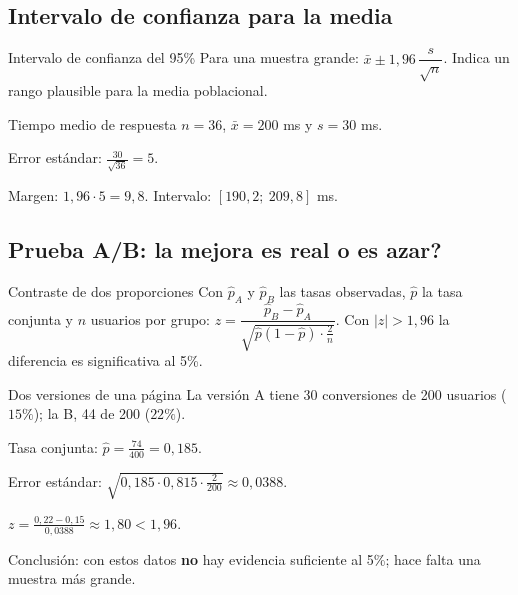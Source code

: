 \begin{center}
\end{center}

\subsection{Intervalo de confianza para la media}
\begin{tmdef}{Intervalo de confianza del 95\%}
Para una muestra grande: $\bar x\pm1{,}96\,\dfrac{s}{\sqrt n}$. Indica un rango plausible para la media poblacional.
\end{tmdef}

\begin{tmejemplo}{Tiempo medio de respuesta}
$n=36$, $\bar x=200$ ms y $s=30$ ms.
\begin{tmpasos}
\item Error est\'andar: $\frac{30}{\sqrt{36}}=5$.
\item Margen: $1{,}96\cdot5=9{,}8$. Intervalo: $[190{,}2;\ 209{,}8]$ ms.
\end{tmpasos}
\end{tmejemplo}

\subsection{Prueba A/B: \textquestiondown la mejora es real o es azar?}
\begin{tmdef}{Contraste de dos proporciones}
Con $\hat p_A$ y $\hat p_B$ las tasas observadas, $\hat p$ la tasa conjunta y $n$ usuarios por grupo: $z=\dfrac{\hat p_B-\hat p_A}{\sqrt{\hat p(1-\hat p)\cdot\frac2n}}$. Con $|z|>1{,}96$ la diferencia es significativa al 5\%.
\end{tmdef}

\begin{tmejemplo}{Dos versiones de una p\'agina}
La versi\'on A tiene 30 conversiones de 200 usuarios ($15\%$); la B, 44 de 200 ($22\%$).
\begin{tmpasos}
\item Tasa conjunta: $\hat p=\frac{74}{400}=0{,}185$.
\item Error est\'andar: $\sqrt{0{,}185\cdot0{,}815\cdot\frac{2}{200}}\approx0{,}0388$.
\item $z=\frac{0{,}22-0{,}15}{0{,}0388}\approx1{,}80<1{,}96$.
\item Conclusi\'on: con estos datos \textbf{no} hay evidencia suficiente al 5\%; hace falta una muestra m\'as grande.
\end{tmpasos}
\end{tmejemplo}

